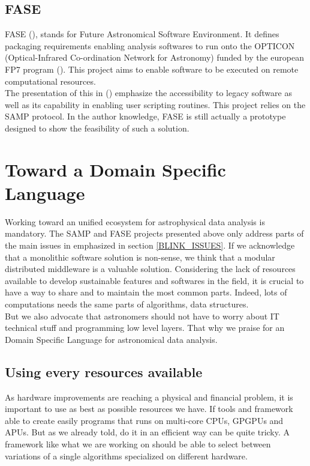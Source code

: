 \documentclass[11pt, twoside]{article}
\begin{document}
		\subsection{FASE}
			FASE (\cite{Granet}), stands for Future Astronomical Software Environment.
			It defines packaging requirements enabling analysis softwares to run onto the OPTICON (Optical-Infrared Co-ordination Network for Astronomy) funded by the european FP7 program (\cite{Fase}).
			This project aims to enable software to be executed on remote computational resources.
			\\
			The presentation of this in (\cite{Grosbol}) emphasize the accessibility to legacy software as well as its capability in enabling user scripting routines.
			This project relies on the SAMP protocol.
			In the author knowledge, FASE is still actually a prototype designed to show the feasibility of such a solution.

	\section{Toward a Domain Specific Language}
		Working toward an unified ecosystem for astrophysical data analysis is mandatory.
		The SAMP and FASE projects presented above only address parts of the main issues in emphasized in section \ref{BLINK_ISSUES}.
		If we acknowledge that a monolithic software solution is non-sense, we think that a modular distributed middleware is a valuable solution.
		Considering the lack of resources available to develop sustainable features and softwares in the field, it is crucial to have a way to share and to maintain the most common parts.
		Indeed, lots of computations needs the same parts of algorithms, data structures.
		\\
		But we also advocate that astronomers should not have to worry about IT technical stuff and programming low level layers.
		That why we praise for an Domain Specific Language for astronomical data analysis.

		\subsection{Using every resources available}
			As hardware improvements are reaching a physical and financial problem, it is important to use as best as possible resources we have.
			If tools and framework able to create easily programs that runs on multi-core CPUs, GPGPUs and APUs.
			But as we already told, do it in an efficient way can be quite tricky.
			A framework like what we are working on should be able to select between variations of a single algorithms specialized on different hardware.
\end{document}
